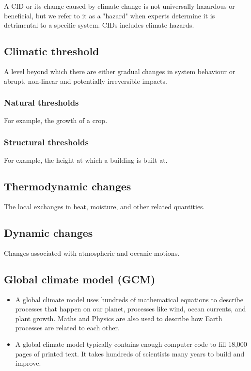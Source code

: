 \documentclass[11pt]{article}
\begin{document}
A CID or its change caused by climate change is not universally hazardous or beneficial, but we refer to it as a "hazard" when experts determine it is detrimental to a specific system. CIDs includes climate hazards.

\subsection{Climatic threshold}
\label{sec:org37c4dfd}
A level beyond which there are either gradual changes in system behaviour or abrupt, non-linear and potentially irreversible impacts.

\subsubsection{Natural thresholds}
\label{sec:org3bb298f}
For example, the growth of a crop.

\subsubsection{Structural thresholds}
\label{sec:org5087c2c}
For example, the height at which a building is built at.

\subsection{Thermodynamic changes}
\label{sec:org81e4bee}
The local exchanges in heat, moisture, and other related quantities.

\subsection{Dynamic changes}
\label{sec:orgba2d9ca}
Changes associated with atmospheric and oceanic motions.

\subsection{Global climate model (GCM)}
\label{sec:orgf1c149e}
\begin{itemize}
\item A global climate model uses hundreds of mathematical equations to describe processes that happen on our planet, processes like wind, ocean currents, and plant growth. Maths and Physics are also used to describe how Earth processes are related to each other.
\item A global climate model typically contains enough computer code to fill 18,000 pages of printed text. It takes hundreds of scientists many years to build and improve.
\end{itemize}
\end{document}
